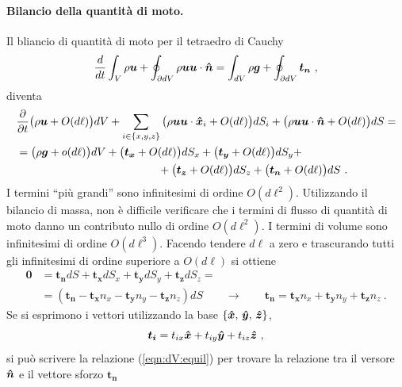 \paragraph{Bilancio della quantità di moto.}
Il bliancio di quantità di moto per il tetraedro di Cauchy
\begin{equation}
 \frac{d}{dt} \int_V \rho \bm{u} + \oint_{\partial dV} \rho \bm{u} \bm{u} \cdot \bm{\hat{n}} = \int_{dV} \rho \bm{g} + \oint_{\partial dV} \bm{t_n} \ ,
\end{equation}
diventa
\begin{equation}
\begin{aligned}
 & \p{}{t} \big( \rho \bm{u} + O(d\ell) \big)dV +
 \sum_{i \in \{x,y,z\}} \big( \rho \bm{u} \bm{u} \cdot \bh{x}_i + O(d\ell) \big)dS_i +
                \big( \rho \bm{u} \bm{u} \cdot \bh{n}   + O(d\ell) \big)dS   = \\
 & = \big( \rho \bm{g} + o(d\ell) \big) dV +
     \big( \bm{t_x} + O(d\ell) \big) dS_x +
     \big( \bm{t_y} + O(d\ell) \big) dS_y + \\
 & \hspace{4.5cm} + \big( \bm{t_z} + O(d\ell) \big) dS_z +
     \big( \bm{t_n} + O(d\ell) \big) dS \ .
\end{aligned}
\end{equation}
I termini ``più grandi'' sono infinitesimi di ordine $O(d\ell^2)$.
Utilizzando il bilancio di massa, non è difficile verificare che i termini di flusso di quantità di moto danno un contributo nullo di ordine $O(d\ell^2)$. I termini di volume sono infinitesimi di ordine $O(d\ell^3)$.
Facendo tendere $d\ell$ a zero e trascurando tutti gli infinitesimi di ordine superiore a $O(d\ell)$ si ottiene
\begin{equation}\label{eqn:dV:equil}
\begin{aligned}
 \bm{0} & = \bm{t_n} dS + \bm{t_x} dS_x + \bm{t_y} dS_y + \bm{t_z} dS_z = \\
  & = ( \bm{t_n} - \bm{t_x} n_x - \bm{t_y} n_y - \bm{t_z} n_z ) dS  \qquad \rightarrow \qquad \bm{t_n} = \bm{t_x} n_x + \bm{t_y} n_y + \bm{t_z} n_z \ .
\end{aligned}
\end{equation}
Se si esprimono i vettori utilizzando la base $\{\bm{\hat{x}}, \, \bm{\hat{y}}, \, \bm{\hat{z}} \}$,
\begin{equation}\label{eqn:t:comp}
  \bm{t_i} = t_{ix} \bm{\hat{x}} + t_{iy} \bm{\hat{y}} + t_{iz} \bm{\hat{z}} \ ,
\end{equation}
si può scrivere la relazione (\ref{eqn:dV:equil}) per trovare la relazione tra il versore $\bm{\hat{n}}$ e il vettore sforzo $\bm{t_n}$
